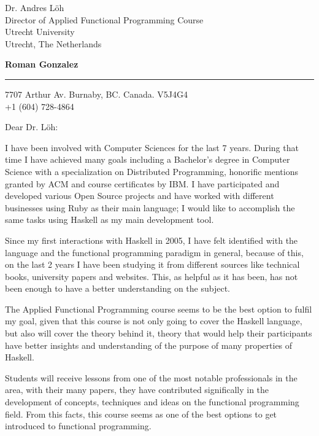 \documentclass{letter} %
\begin{document}
\signature{Roman Gonzalez.}           %
\longindentation=0pt                  %
\let\raggedleft\raggedright           %
 
 
\begin{letter}{Dr. Andres L\"oh \\
Director of Applied Functional Programming Course \\
Utrecht University \\
Utrecht, The Netherlands}


\begin{flushleft}
{\large\bf Roman Gonzalez}
\end{flushleft}
\medskip\hrule height 1pt
\begin{flushright}
\hfill 7707 Arthur Av. Burnaby, BC. Canada. V5J4G4 \\
\hfill +1 (604) 728-4864
\end{flushright} 
\vfill %

 
\opening{Dear Dr. L\"oh:} 
 
\noindent I have been involved with Computer Sciences for the last 7 years. 
During that time I have achieved many goals including a Bachelor's degree in 
Computer Science with a specialization on Distributed Programming, honorific 
mentions granted by ACM and course certificates by IBM. I have participated and developed various Open 
Source projects and have worked with different businesses using Ruby as their 
main language; I would like to accomplish the same tasks using Haskell as my main
development tool. 

\noindent Since my first interactions with Haskell in 2005, I have felt identified with the 
language and the functional programming paradigm in general, because of this, on the last 2 years 
I have been studying it from different sources like technical books, university papers and websites. 
This, as helpful as it has been, has not been enough to have a better understanding on the subject.

\noindent The Applied Functional Programming course seems to be the best option to fulfil my goal, given that this 
course is not only going to cover the Haskell language, but also will cover the theory behind it, theory that 
would help their participants have better insights and understanding of the purpose of many properties of Haskell. 

\noindent Students will receive lessons from one of the most notable professionals in the area, with 
their many papers, they have contributed significally in the development of concepts, techniques and ideas on the functional
programming field. From this facts, this course seems as one of the best options to get introduced to functional programming.


\end{letter}
\end{document}
